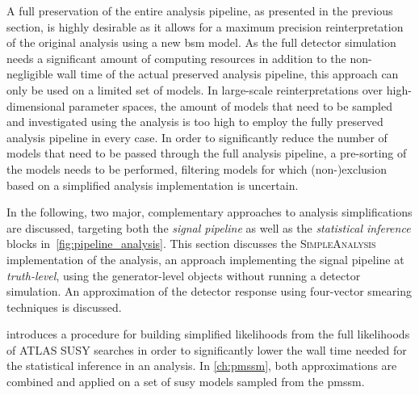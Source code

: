 A full preservation of the entire analysis pipeline, as presented in the previous section, is highly desirable as it allows for a maximum precision reinterpretation of the original analysis using a new \gls{bsm} model. As the full detector simulation needs a significant amount of computing resources in addition to the non-negligible wall time of the actual preserved analysis pipeline, this approach can only be used on a limited set of models. In large-scale reinterpretations over high-dimensional parameter spaces, the amount of models that need to be sampled and investigated using the analysis is too high to employ the fully preserved analysis pipeline in every case. In order to significantly reduce the number of models that need to be passed through the full analysis pipeline, a pre-sorting of the models needs to be performed, filtering models for which (non-)exclusion based on a simplified analysis implementation is uncertain.

In the following, two major, complementary approaches to analysis simplifications are discussed, targeting both the \textit{signal pipeline} as well as the \textit{statistical inference} blocks in~\cref{fig:pipeline_analysis}. This section discusses the \textsc{SimpleAnalysis} implementation of the analysis, an approach implementing the signal pipeline at \textit{truth-level}, \ie using the generator-level objects without running a detector simulation. An approximation of the detector response using four-vector smearing techniques is discussed.

 introduces a procedure for building simplified likelihoods from the full likelihoods of ATLAS SUSY searches in order to significantly lower the wall time needed for the statistical inference in an analysis. 
In \cref{ch:pmssm}, both approximations are combined and applied on a set of \gls{susy} models sampled from the \gls{pmssm}.


